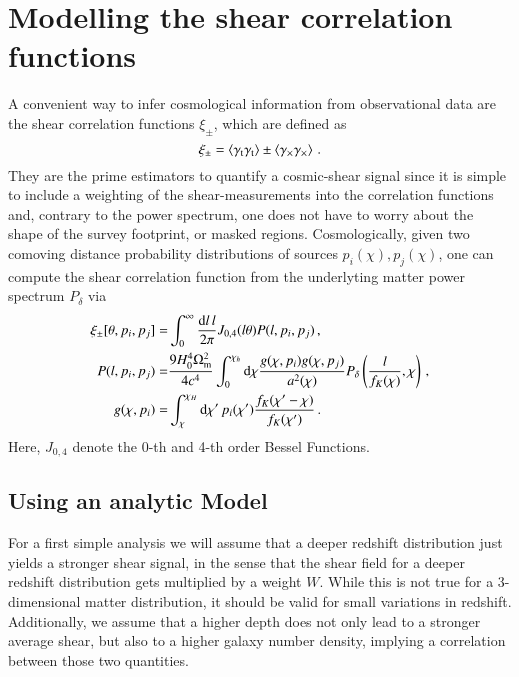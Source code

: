 \section{Modelling the shear correlation functions}
\label{sec:xipm}
A convenient way to infer cosmological information from observational data are the shear correlation functions $\xi_\pm$, which are defined as \[
\xi_\pm = \left< \gamma_{\mathrm t}\gamma_{\mathrm t}\right> \pm \left< \gamma_\times\gamma_\times\right> \, .
\]
They are the prime estimators to quantify a cosmic-shear signal since it is simple to include a weighting of the shear-measurements into the correlation functions and, contrary to the power spectrum, one does not have to worry about the shape of the survey footprint, or masked regions. Cosmologically, given two comoving distance probability distributions of sources $p_i(\chi),p_j(\chi)$, one can compute the shear correlation function from the underlyting matter power spectrum $P_\delta$ via \begin{align}
\label{eq:xipm-pkappa}
\xi_\pm[\theta,p_i,p_j] =& \int_0^\infty \frac{{\rm d}l\,l}{2\pi}J_{0,4}(l\theta)P(l,p_i,p_j)\, , \\
\label{eq:pkappa-pdelta/lenseff}
P(l,p_i,p_j) =& \frac{9 H_0^4\Omega_{\rm m}^2}{4c^4}\int_0^{\chi_h} {\rm d}\chi\frac{g(\chi,p_i)g(\chi,p_j)}{a^2(\chi)}P_\delta\left(\frac{l}{f_K(\chi)},\chi\right)\, , \\
\label{eq:lenseff}
g(\chi,p_i) =& \int_\chi^{\chi_H} {\rm d}\chi'\, p_i(\chi') \frac{f_K(\chi'-\chi)}{f_K(\chi')}\, .
\end{align}
Here, $J_{0,4}$ denote the 0-th and 4-th order Bessel Functions.
\subsection{Using an analytic Model}
\label{sec:xipm_analytic}
For a first simple analysis we will assume that a deeper redshift distribution just yields a stronger shear signal, in the sense that the shear field for a deeper redshift distribution gets multiplied by a weight $W$. While this is not true for a 3-dimensional matter distribution, it should be valid for small variations in redshift. Additionally, we assume that a higher depth does not only lead to a stronger average shear, but also to a higher galaxy number density, implying a correlation between those two quantities.

